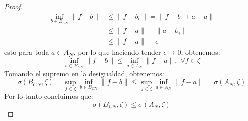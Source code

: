 \documentclass[12pt,a4paper]{book}
\providecommand{\norm}[1]{\lVert#1\rVert}
\begin{document}
\begin{proof}
\begin{equation*}
\begin{split}
\inf_{b\in B_{CN}}\norm{f-b} &\leq\norm{f-b_{\epsilon}}=\norm{f-b_{\epsilon}+a-a}\\&
\leq \norm{f-a}+\norm{a-b_{\epsilon}}\\&
\leq \norm{f-a}+\epsilon
\end{split}
\end{equation*}
esto para toda $a\in A_{N}$, por lo que haciendo tender $\epsilon\rightarrow 0$, obtenemos:
$$\inf_{b\in B_{CN}}\norm{f-b}\leq \inf_{a\in A_{N}}\norm{f-a},\;\forall f\in \zeta$$
Tomando el supremo en la desigualdad, obtenemos:
$$\sigma(B_{CN},\zeta)=\sup_{f\in\zeta}\inf_{b\in B_{CN}}\norm{f-b}\leq \sup_{f\in \zeta}\inf_{a\in A_{N}}\norm{f-a}=\sigma(A_{N},\zeta)$$
Por lo tanto concluimos que:
$$\sigma(B_{CN},\zeta)\leq \sigma(A_{N},\zeta)$$
\end{proof}
\end{document}
